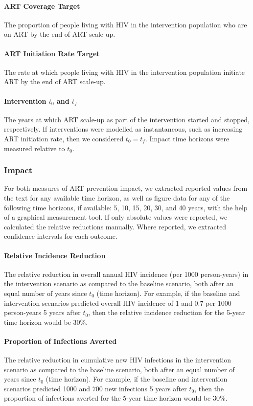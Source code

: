 \paragraph{ART Coverage Target}
The proportion of people living with HIV in the intervention population who are on ART
by the end of ART scale-up.
\paragraph{ART Initiation Rate Target}
The rate at which people living with HIV in the intervention population initiate ART
by the end of ART scale-up.
\paragraph{Intervention $t_0$ and $t_f$}
The years at which ART scale-up as part of the intervention started and stopped, respectively.
If interventions were modelled as instantaneous, such as increasing ART initiation rate,
then we considered $t_0 = t_f$.
Impact time horizons were measured relative to $t_0$.
\subsubsection{Impact}\label{app.sr.defs.api.impact}
For both measures of ART prevention impact,
we extracted reported values from the text for any available time horizon,
as well as figure data for any of the following time horizons, if available:
5, 10, 15, 20, 30, and 40 years, with the help of a graphical measurement tool.
If only absolute values were reported, we calculated the relative reductions manually.
Where reported, we extracted confidence intervals for each outcome.
\paragraph{Relative Incidence Reduction}
The relative reduction in overall annual HIV incidence (per 1000 person-years)
in the intervention scenario as compared to the baseline scenario,
both after an equal number of years since $t_0$ (time horizon).
For example, if the baseline and intervention scenarios predicted
overall HIV incidence of 1 and 0.7 per 1000 person-years 5 years after $t_0$,
then the relative incidence reduction for the 5-year time horizon would be 30\%.
\paragraph{Proportion of Infections Averted}
The relative reduction in cumulative new HIV infections
in the intervention scenario as compared to the baseline scenario,
both after an equal number of years since $t_0$ (time horizon).
For example, if the baseline and intervention scenarios predicted
1000 and 700 new infections 5 years after $t_0$,
then the proportion of infections averted for the 5-year time horizon would be 30\%.
